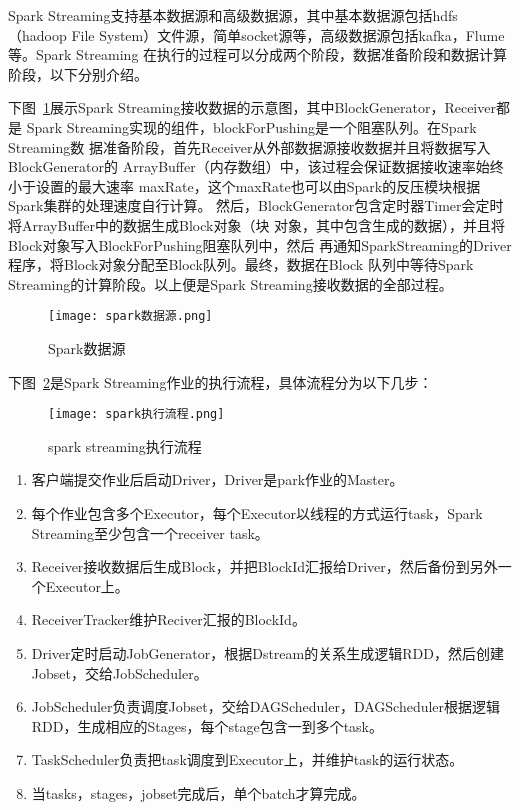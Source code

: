 Spark Streaming支持基本数据源和高级数据源，其中基本数据源包括hdfs（hadoop File System）文件源，简单socket源等，高级数据源包括kafka，Flume等。Spark Streaming
在执行的过程可以分成两个阶段，数据准备阶段和数据计算阶段，以下分别介绍。

下图~\ref{fig:spark}展示Spark Streaming接收数据的示意图，其中BlockGenerator，Receiver都是
Spark Streaming实现的组件，blockForPushing是一个阻塞队列。在Spark Streaming数
据准备阶段，首先Receiver从外部数据源接收数据并且将数据写入BlockGenerator的
ArrayBuffer（内存数组）中，该过程会保证数据接收速率始终小于设置的最大速率
maxRate，这个maxRate也可以由Spark的反压模块根据Spark集群的处理速度自行计算。
然后，BlockGenerator包含定时器Timer会定时将ArrayBuffer中的数据生成Block对象（块
对象，其中包含生成的数据），并且将Block对象写入BlockForPushing阻塞队列中，然后
再通知SparkStreaming的Driver程序，将Block对象分配至Block队列。最终，数据在Block
队列中等待Spark Streaming的计算阶段。以上便是Spark Streaming接收数据的全部过程。
\begin{figure}
    \centering
    \texttt{[image: spark数据源.png]}
    \caption{Spark数据源}
    \label{fig:spark}
  \end{figure}

  下图~\ref{fig:spark streaming}是Spark Streaming作业的执行流程，具体流程分为以下几步：
  \begin{figure}
    \centering
    \texttt{[image: spark执行流程.png]}
    \caption{spark streaming执行流程}
    \label{fig:spark streaming}
  \end{figure}
 
  \begin{enumerate}[1.]
      \item  客户端提交作业后启动Driver，Driver是park作业的Master。
      \item 每个作业包含多个Executor，每个Executor以线程的方式运行task，Spark Streaming至少包含一个receiver task。
      \item Receiver接收数据后生成Block，并把BlockId汇报给Driver，然后备份到另外一个Executor上。
      \item ReceiverTracker维护Reciver汇报的BlockId。
      \item Driver定时启动JobGenerator，根据Dstream的关系生成逻辑RDD，然后创建Jobset，交给JobScheduler。
      \item JobScheduler负责调度Jobset，交给DAGScheduler，DAGScheduler根据逻辑RDD，生成相应的Stages，每个stage包含一到多个task。
      \item TaskScheduler负责把task调度到Executor上，并维护task的运行状态。
      \item 当tasks，stages，jobset完成后，单个batch才算完成。
  \end{enumerate}

